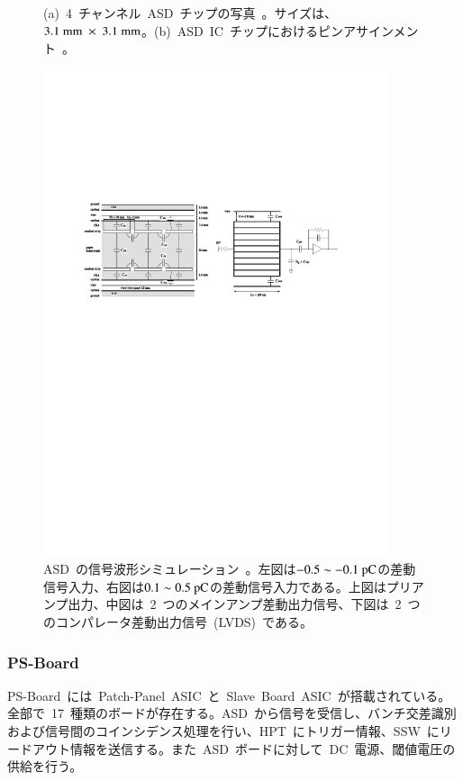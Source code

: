 \begin{figure}[tbp]
\begin{minipage}{0.49\hsize}
        \subcaption{}
        \end{minipage}
        \caption[ASD~チップの詳細]{(a)~4~チャンネル~ASD~チップの写真~\cite{URL:06}。サイズは、$3.1~\rm{mm}~\times~3.1~\rm{mm}$。(b)~ASD~IC~チップにおけるピンアサインメント~\cite{URL:06}。}\label{fig:ASD}
\end{figure}

\begin{figure}[tbp]
        \centering   
        \includegraphics[width=0.9\textwidth,page=2]{img/pdf/ASD.pdf}
        \caption[ASD~の信号波形シミュレーション]{ASD~の信号波形シミュレーション~\cite{URL:06}。左図は$\rm{-0.5\sim-0.1}~\rm{pC}$の差動信号入力、右図は$\rm{0.1\sim0.5}~\rm{pC}$の差動信号入力である。上図はプリアンプ出力、中図は~2~つのメインアンプ差動出力信号、下図は~2~つのコンパレータ差動出力信号~(LVDS)~である。}
        \label{fig:signal}
\end{figure}

\subsubsection{PS-Board}
PS-Board~には~Patch-Panel~ASIC~と~Slave~Board~ASIC~が搭載されている。全部で~17~種類のボードが存在する。ASD~から信号を受信し、バンチ交差識別および信号間のコインシデンス処理を行い、HPT~にトリガー情報、SSW~にリードアウト情報を送信する。また~ASD~ボードに対して~DC~電源、閾値電圧の供給を行う。

